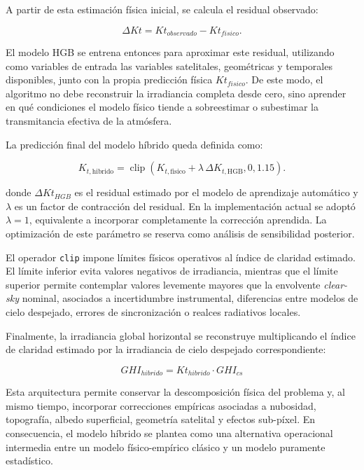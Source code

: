 \documentclass[../main.tex]{subfiles}
\begin{document}
A partir de esta estimación física inicial, se calcula el residual observado:

\begin{equation}
\Delta Kt =
Kt_{observado} - Kt_{fisico}.
\end{equation}

El modelo HGB se entrena entonces para aproximar este residual, utilizando como variables de entrada las variables satelitales, geométricas y temporales disponibles, junto con la propia predicción física $Kt_{fisico}$. De este modo, el algoritmo no debe reconstruir la irradiancia completa desde cero, sino aprender en qué condiciones el modelo físico tiende a sobreestimar o subestimar la transmitancia efectiva de la atmósfera.

La predicción final del modelo híbrido queda definida como:

\begin{equation}
K_{t,\mathrm{hibrido}}
=
\operatorname{clip}
\left(
K_{t,\mathrm{fisico}}
+
\lambda \, \Delta K_{t,\mathrm{HGB}},
0,
1.15
\right).
\label{eq:kt_hibrido}
\end{equation}

donde $\Delta Kt_{HGB}$ es el residual estimado por el modelo de aprendizaje automático y $\lambda$ es un factor de contracción del residual. En la implementación actual se adoptó $\lambda = 1$, equivalente a incorporar completamente la corrección aprendida. La optimización de este parámetro se reserva como análisis de sensibilidad posterior.

El operador \texttt{clip} impone límites físicos operativos al índice de claridad estimado. El límite inferior evita valores negativos de irradiancia, mientras que el límite superior permite contemplar valores levemente mayores que la envolvente \textit{clear-sky} nominal, asociados a incertidumbre instrumental, diferencias entre modelos de cielo despejado, errores de sincronización o realces radiativos locales.

Finalmente, la irradiancia global horizontal se reconstruye multiplicando el índice de claridad estimado por la irradiancia de cielo despejado correspondiente:

\begin{equation}
    GHI_{hibrido} = Kt_{hibrido} \cdot GHI_{cs}
\end{equation}

Esta arquitectura permite conservar la descomposición física del problema y, al mismo tiempo, incorporar correcciones empíricas asociadas a nubosidad, topografía, albedo superficial, geometría satelital y efectos sub-píxel. En consecuencia, el modelo híbrido se plantea como una alternativa operacional intermedia entre un modelo físico-empírico clásico y un modelo puramente estadístico.
\end{document}
